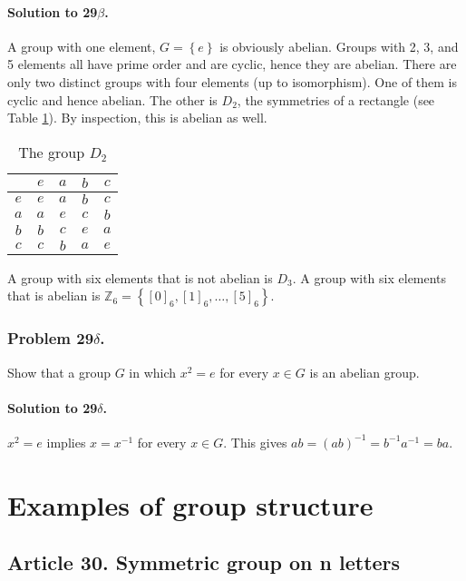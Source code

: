 \paragraph*{Solution to 29$\beta$.}
A group with one element, $G = \left\{ e \right\}$ is obviously abelian. Groups
with 2, 3, and 5 elements all have prime order and are cyclic, hence they are
abelian. There are only two distinct groups with four elements (up to isomorphism).
One of them is cyclic and hence abelian. The other is $D_2$, the symmetries of
a rectangle (see Table \ref{table:group_d2}). By inspection, this is abelian
as well.

\begin{table}[ht]
\begin{center}
\begin{tabular}[ht]{c|cccc}
    & $e$ & $a$ & $b$ & $c$ \\
\hline
$e$ & $e$ & $a$ & $b$ & $c$ \\
$a$ & $a$ & $e$ & $c$ & $b$ \\
$b$ & $b$ & $c$ & $e$ & $a$ \\
$c$ & $c$ & $b$ & $a$ & $e$ \\
\end{tabular}
\end{center}
\caption{The group $D_2$}
\label{table:group_d2}
\end{table}

A group with six elements that is not abelian is $D_3$. A group with six
elements that is abelian is $\mathbb{Z}_6 = \left\{[0]_6, [1]_6, \dots ,[5]_6 \right\}$.

\subsubsection{Problem 29$\delta$.}
Show that a group $G$ in which $x^2 = e$ for every $ x \in G$ is an abelian group.

\paragraph*{Solution to 29$\delta$.}
$x^2 = e $ implies $x = x^{-1}$ for every $ x \in G$.
This gives $ ab = (ab)^{-1} = b^{-1} a^{-1} = ba$.


\section{Examples of group structure}


\subsection{Article 30. Symmetric group on n letters}
